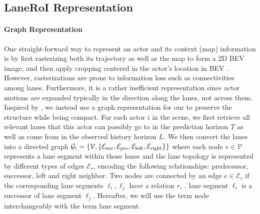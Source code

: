 \subsection{LaneRoI Representation}
\label{sec:laneroi}


\paragraph{Graph Representation}
One straight-forward way to represent an actor and its context (map) information
is by first rasterizing both its trajectory as well as the map to form a 2D BEV
image, and then apply cropping centered in the actor's location in BEV \cite{dsd, mfp, matf, spagnn}.
However, rasterizations are prone to information loss such as 
connectivities among lanes. 
Furthermore, it is a rather inefficient representation
since actor motions are expanded typically in the direction along the lanes, not across them. 
Inspired by \cite{lgn}, we instead use a graph representation for our \ROI to
preserve the structure while being compact. For each actor $i$ in the scene, we first
retrieve all relevant lanes that this actor can possibly go to in the prediction horizon
$T$ as well as come from in the observed history horizon $L$. We then convert the
lanes into a directed graph $\mathcal{G}_i =
\{\mathcal{V}, \{ \mathcal{E}_\text{suc}, \mathcal{E}_\text{pre},
    \mathcal{E}_\text{left}, \mathcal{E}_\text{right} \}\}$
where each node $v \in \mathcal{V}$ represents a lane segment within those lanes 
and the lane topology is represented by different types of edges $\mathcal{E}_r$,
encoding the following relationships: predecessor, successor, left
and right neighbor.  
Two nodes are connected by an edge $e \in \mathcal{E}_r$ if the corresponding lane segments $\ell_i,
\ell_j$ have a relation $r$, \eg, lane segment $\ell_i$ is a
successor of lane segment $\ell_j$.
Hereafter, we will use the term node interchangeably with the term lane segment. 











